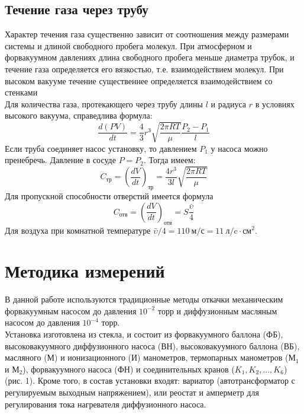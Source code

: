 \documentclass[a4paper, 12pt]{article}
\begin{document}
\subsection{Течение газа через трубу}
Характер течения газа существенно зависит от соотношения между размерами системы и длиной свободного пробега молекул. При атмосферном и форвакуумном давлениях  длина свободного пробега меньше диаметра трубок, и течение газа определяется его вязкостью, т.е. взаимодействием молекул. При высоком вакууме течение существеннее определяется взаимодействием со стенками \\
Для количества газа, протекающего через трубу длины $l$ и радиуса $r$ в условиях высокого вакуума, справедлива формула:
\begin{equation}\label{5}
	\frac{d(PV)}{dt} = \frac{4}{3}r^3\sqrt{\frac{2\pi RT}{\mu}}\frac{P_2 - P_1}{l}
\end{equation}
Если труба соединяет насос установку, то давлением $P_1$ у насоса можно пренебречь. Давление в сосуде $P = P_2$. Тогда имеем:
\begin{equation}\label{6}
C_\text{тр} = \left(\frac{dV}{dt}\right)_\text{тр} = \frac{4r^3}{3l}\sqrt{\frac{2\pi RT}{\mu}}
\end{equation}
Для пропускной способности отверстий имеется формула
\begin{equation}\label{7}
C_\text{отв} = \left(\frac{dV}{dt}\right)_\text{отв} = S\frac{\bar{\upsilon}}{4}
\end{equation}
Для воздуха при комнатной температуре $\bar{\upsilon}/4 = 110~\text{м/с} = 11~\text{л/c}\cdot\text{см}^2$.

\section{Методика измерений}

В данной работе используются традиционные методы откачки механическим форвакуумным насосом до давления $10^{-2}$ торр и диффузионным масляным насосом до давления $10^{-4}$ торр. \\
 	Установка изготовлена из стекла,
 и состоит из форвакуумного баллона (ФБ), высоковакуумного диффузионного насоса (ВН), высоковакуумного баллона (ВБ), масляного (М) и ионизационного (И) манометров, термопарных манометров ($\text{М}_1$ и $\text{М}_2$), форвакуумного насоса (ФН) и соединительных кранов ($K_1, K_2,..., K_6$) (рис. 1). Кроме того, в состав установки входят: вариатор
 (автотрансформатор с регулируемым выходным напряжением), или
 реостат и амперметр для регулирования тока нагревателя диффузионного насоса. \\
 
\end{document}
